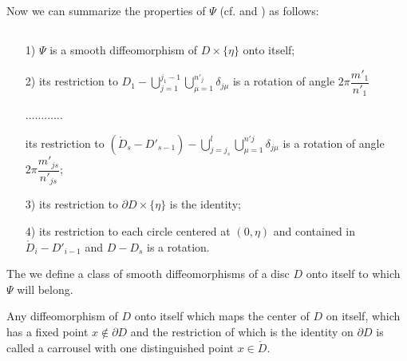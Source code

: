 Now we can summarize the properties of $\Psi$ (cf. \cite{art15-key6} and \cite{art15-key8}) as follows:

\setcounter{subsection}{6}
\subsection{}\label{art15-subsec2.7}
\begin{itemize}
\item[1)] $\Psi$ is a smooth diffeomorphism of $D \times \{\eta\}$ onto itself;

\item[2)] its restriction to $D_1 - \bigcup\limits^{j_1 -1}_{j=1} \bigcup\limits^{n'_j}_{\mu=1} \delta_{j\mu}$  is a rotation of angle $2\pi \dfrac{m'_1}{n'_1}$

$\ldots\ldots \ldots \ldots $\pageoriginale

its restriction to $(\mathring{D}_s - D'_{s-1}) - \bigcup\limits^l_{j=j_s} \bigcup\limits^{n'j}_{\mu=1} \delta_{j\mu}$ is a rotation of angle $2\pi \dfrac{m'_{js}}{n'_{js}}$;

\item[3)] its restriction to $\partial D \times \{\eta\}$ is the identity;

\item[4)] its restriction to each circle centered at $(0, \eta)$ and contained in $\mathring{D}_i - D'_{i-1}$ and $D - D_s$ is a rotation.
\end{itemize}

The we define a class of smooth diffeomorphisms of a disc $D$ onto itself to which $\Psi$ will belong.

\setcounter{lemma}{7}
\begin{definition}\label{art15-def2.8}
Any diffeomorphism of $D$ onto itself which maps the center of $D$ on itself, which has a fixed point $x \not\in \partial D$ and the restriction of which is the identity on $\partial D$ is called a carrousel with one distinguished point $x \in \mathring{D}$.
\end{definition}

